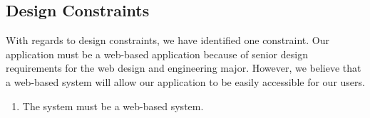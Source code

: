 \subsection{Design Constraints}
With regards to design constraints, we have identified one constraint. Our application must be a web-based application because of senior design requirements for the web design and engineering major. However, we believe that a web-based system will allow our application to be easily accessible for our users. 
\begin{enumerate}
\item The system must be a web-based system.
\end{enumerate}
